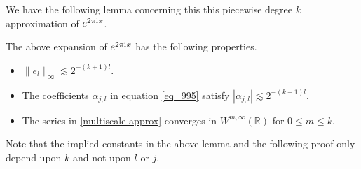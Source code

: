 We have the following lemma concerning this this piecewise degree $k$ approximation of $e^{2\pi {\mathrm{i}\mkern1mu}   x}$.
\begin{lemma}\label{multilevel-spline}
 The above expansion of $e^{2\pi {\mathrm{i}\mkern1mu} x}$ has the following properties.
 \begin{itemize}
  \item $\|e_l\|_{\infty} \lesssim 2^{-(k+1)l}$.
  \item The coefficients $\alpha_{j,l}$ in equation \eqref{eq_995} satisfy $|\alpha_{j,l}| \lesssim 2^{-(k+1)l}$.
  \item The series in \eqref{multiscale-approx} converges in $W^{m,\infty}(\mathbb{R})$ for $0 \leq m \leq k$.
 \end{itemize}
\end{lemma}
Note that the implied constants in the above lemma and the following proof only depend upon $k$ and not upon $l$ or $j$.
